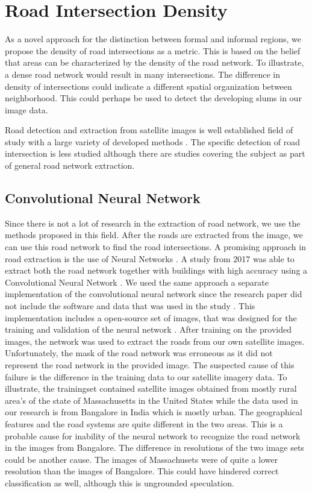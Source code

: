 \section{Road Intersection Density}

As a novel approach for the distinction between formal and informal regions, we
propose the density of road intersections as a metric. This is based on the belief that areas can be characterized by the density of the road network. To illustrate, a dense road network would result in many intersections. The difference in density of intersections could indicate a different spatial organization between neighborhood. This could perhaps be used to detect the developing slums in our image data.

Road detection and extraction from satellite images is well established field of study with a large variety of developed methods \cite{mena2003state}.  The specific detection of road intersection is less studied although there are studies covering the subject \cite{hu2007road} \cite{koutaki2004automatic} as part of general road network extraction. 

\subsection{Convolutional Neural Network}

Since there is not a lot of research in the extraction of road network, we use the methods proposed in this field. After the roads are extracted from the image, we can use this road network to find the road intersections. A promising approach in road extraction is the use of Neural Networks \cite{mangala2011extraction} \cite{mokhtarzade2007road}. A study from 2017 was able to extract both the road network together with buildings with high accuracy using a Convolutional Neural Network \cite{alshehhi2017simultaneous}. We used the same approach a separate implementation of the convolutional neural network since the research paper did not include the software and data that was used in the study \cite{airs}. This implementation includes a open-source set of images, that was designed for the training and validation of the neural network \cite{MnihThesis}. After training on the provided images, the network was used to extract the roads from our own satellite images.  Unfortunately, the mask of the road network was erroneous as it did not represent the road network in the provided image. The suspected cause of this failure is the difference in the training data to our satellite imagery data. To illustrate, the trainingset contained satellite images obtained from mostly rural area's of the state of Massachusetts in the United States while the data used in our research is from Bangalore in India which is mostly urban. The geographical features and the road systems are quite different in the two areas. This is a probable cause for inability of the neural network to recognize the road network in the images from Bangalore. The difference in resolutions
of the two image sets could be another cause. The images of Massachusets were of quite a lower resolution than the images of Bangalore. This could have hindered correct classification as well, although this is ungrounded speculation.

